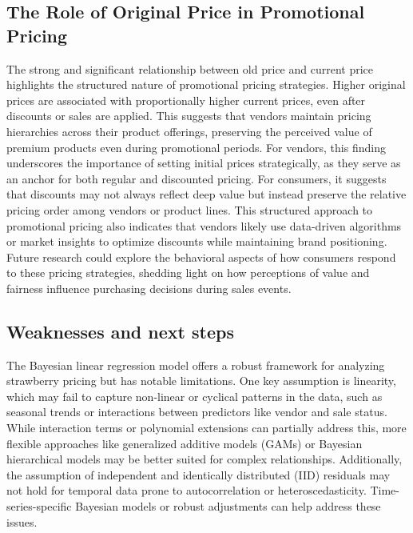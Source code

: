 \documentclass[
  letterpaper,
  DIV=11,
  numbers=noendperiod]{scrartcl}
\begin{document}
\subsection{The Role of Original Price in Promotional
Pricing}\label{the-role-of-original-price-in-promotional-pricing}

The strong and significant relationship between old price and current
price highlights the structured nature of promotional pricing
strategies. Higher original prices are associated with proportionally
higher current prices, even after discounts or sales are applied. This
suggests that vendors maintain pricing hierarchies across their product
offerings, preserving the perceived value of premium products even
during promotional periods. For vendors, this finding underscores the
importance of setting initial prices strategically, as they serve as an
anchor for both regular and discounted pricing. For consumers, it
suggests that discounts may not always reflect deep value but instead
preserve the relative pricing order among vendors or product lines. This
structured approach to promotional pricing also indicates that vendors
likely use data-driven algorithms or market insights to optimize
discounts while maintaining brand positioning. Future research could
explore the behavioral aspects of how consumers respond to these pricing
strategies, shedding light on how perceptions of value and fairness
influence purchasing decisions during sales events.

\subsection{Weaknesses and next steps}\label{weaknesses-and-next-steps}

The Bayesian linear regression model offers a robust framework for
analyzing strawberry pricing but has notable limitations. One key
assumption is linearity, which may fail to capture non-linear or
cyclical patterns in the data, such as seasonal trends or interactions
between predictors like vendor and sale status. While interaction terms
or polynomial extensions can partially address this, more flexible
approaches like generalized additive models (GAMs) or Bayesian
hierarchical models may be better suited for complex relationships.
Additionally, the assumption of independent and identically distributed
(IID) residuals may not hold for temporal data prone to autocorrelation
or heteroscedasticity. Time-series-specific Bayesian models or robust
adjustments can help address these issues.
\end{document}
